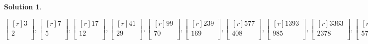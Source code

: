 \documentclass[12pt]{article}
\theoremstyle{definition}
\newtheorem*{solution}{Solution} %
\theoremstyle{plain}
\begin{document}
\begin{enumerate}
\begin{solution}
\begin{enumerate}
\[ \begin{bmatrix}[r]3\\2\\\end{bmatrix},\begin{bmatrix}[r]7\\5\\\end{bmatrix},\begin{bmatrix}[r]17\\12\\\end{bmatrix},\begin{bmatrix}[r]41\\29\\\end{bmatrix},\begin{bmatrix}[r]99\\70\\\end{bmatrix},\begin{bmatrix}[r]239\\169\\\end{bmatrix},\begin{bmatrix}[r]577\\408\\\end{bmatrix},\begin{bmatrix}[r]1393\\985\\\end{bmatrix},\begin{bmatrix}[r]3363\\2378\\\end{bmatrix},\begin{bmatrix}[r]8119\\5741\\\end{bmatrix} \]


\end{enumerate}
\end{solution}
\end{enumerate}
\end{document}
